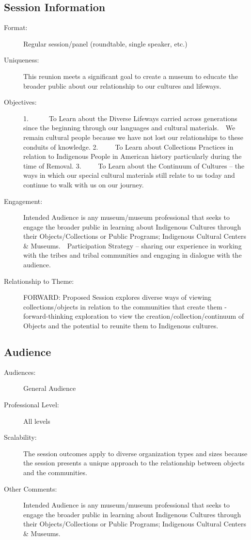 \documentclass{report}
\begin{document}
              \subsection*{Session Information}
                \begin{description}
                  \item [Format:] Regular session/panel (roundtable, single speaker, etc.)
							    
							    \item [Uniqueness:]This reunion meets a significant goal to create a museum to educate the broader public about our relationship to our cultures and lifeways.
							    \item [Objectives:]1.      To Learn about the Diverse Lifeways carried across generations since the beginning through our languages and cultural materials.  We remain cultural people because we have not lost our relationships to these conduits of knowledge.
2.     To Learn about Collections Practices in relation to Indigenous People in American history particularly during the time of Removal.
3.     To Learn about the Continuum of Cultures – the ways in which our special cultural materials still relate to us today and continue to walk with us on our journey.
							    \item [Engagement:]Intended Audience is any museum/museum professional that seeks to engage the broader public in learning about Indigenous Cultures through their Objects/Collections or Public Programs; Indigenous Cultural Centers \& Museums.  Participation Strategy – sharing our experience in working with the tribes and tribal communities and engaging in dialogue with the audience.
							    \item [Relationship to Theme:]FORWARD:  Proposed Session explores diverse ways of viewing collections/objects in relation to the communities that create them - forward-thinking exploration to view the creation/collection/continuum of Objects and the potential to reunite them to Indigenous cultures.
							    
                \end{description}
              \subsection*{Audience}
                \begin{description}
                  \item [Audiences:]General Audience~
                  \item[Professional Level:]All levels~
                \item[Scalability:] The session outcomes apply to diverse organization types and sizes because the session presents a unique approach to the relationship between objects and the communities.

							
              \item[Other Comments:] Intended Audience is any museum/museum professional that seeks to engage the broader public in learning about Indigenous Cultures through their Objects/Collections or Public Programs; Indigenous Cultural Centers \& Museums.
              \end{description}
\end{document}
